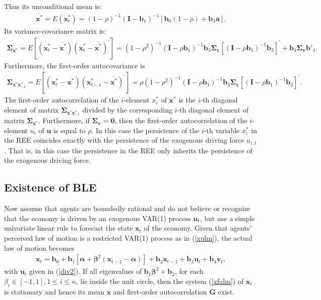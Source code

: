 Thus its unconditional mean is:
\begin{eqnarray}\label{mxree}
\overline{\pmb x^*}={ E}
({\pmb x}^*_t)=(1-\rho)^{-1}({\pmb I}-{\pmb b}_1)^{-1}[{\pmb b}_0(1-\rho)+{\pmb b}_3\pmb a].
\end{eqnarray}
Its variance-covariance matrix is:
\begin{eqnarray}\label{mxreev}
\pmb\Sigma_{\pmb x^*} = E[({\pmb x}^*_t-\overline{{\pmb x}^*})({\pmb x}^*_t-\overline{{\pmb x}^*})^{'}]={(1-\rho^2)^{-1}}({\pmb I}-\rho{\pmb b}_1)^{-1}{\pmb b}_3\pmb{\Sigma_{\pmb\varepsilon}}[({\pmb I}-\rho{\pmb b}_1)^{-1}{\pmb b}_3]^{'}+{\pmb b}_4\pmb{\Sigma_{ v}}{\pmb b}'_4.
\end{eqnarray}
Furthermore, the first-order autocovariance is
\begin{eqnarray}\label{mxreev}
\pmb\Sigma_{{\pmb x}^*{\pmb x}^*_{-1}}= E[({\pmb x}^*_t-\overline{{\pmb x}^*})({\pmb x}^*_{t-1}-\overline{{\pmb x}^*})^{'}]=\rho(1-\rho^2)^{-1}({\pmb I}-\rho{\pmb b}_1)^{-1}{\pmb b}_3\pmb{\Sigma_{\pmb\varepsilon}}[({\pmb I}-\rho{\pmb b}_1)^{-1}{\pmb b}_3]^{'}.
\end{eqnarray}
The first-order autocorrelation of the $i$-element $x_i^*$ of $\pmb x^*$ is the $i$-th diagonal element of matrix $\pmb\Sigma_{{\pmb x}^*{\pmb x}^*_{-1}}$ divided by the corresponding $i$-th diagonal element of matrix $\pmb\Sigma_{\pmb x^*}$. Furthermore, if $\pmb{\Sigma_{\pmb v}}=\pmb 0$, then the first-order autocorrelation of the $i$-element $u_i$ of $\pmb u$ is equal to $\rho$. In this case
the persistence of the $i$-th variable $x_i^*$ in the REE
coincides exactly with the persistence of the exogenous driving force $u_{i,t}$. That is, in this case the persistence in the REE only inherits the persistence of the exogenous driving force.

\subsection*{Existence of BLE}
\label{sec:exist} %
Now assume that agents are boundedly rational and do not believe or recognize that the economy is driven by an exogenous VAR(1) process ${\pmb u}_t$, but use a simple univariate linear rule to
forecast the state ${\pmb x}_t$ of the economy. Given that agents'
perceived law of motion is a restricted VAR(1) process as in (\ref{xplm}), the actual
law of motion becomes
\begin{eqnarray}\label{xfalm}
{\pmb x}_t={\pmb b}_0+{\pmb b}_1[\pmb\alpha+{\pmb\beta}^2({\pmb x}_{t-1}-\pmb\alpha)]+ {\pmb b}_2{\pmb x}_{t-1}+{\pmb b}_3{\pmb u}_t + {\pmb b}_4{\pmb v}_t,
\end{eqnarray}
with ${\pmb u}_t$ given in (\ref{div2}). If all eigenvalues of ${\pmb b}_1{\pmb\beta}^2+{\pmb b}_2$, for each $\beta_i\in[-1,1],  1 \leq i \leq n $, lie inside the unit circle, then the system (\ref{xfalm}) of ${\pmb x}_t$ is stationary and hence its mean $\overline{\pmb x}$ and first-order autocorrelation $\pmb G$ exist.

